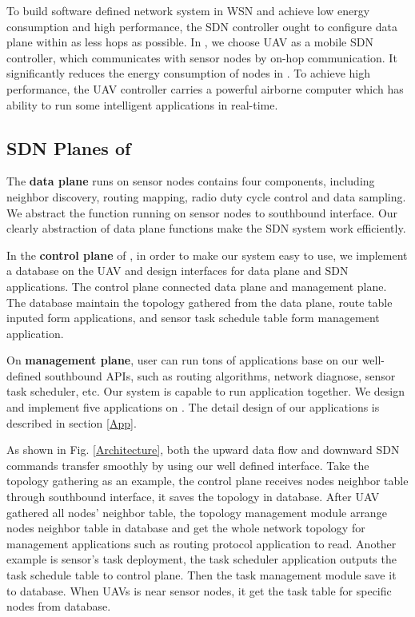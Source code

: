 To build software defined network system in WSN and achieve low 
energy consumption and high performance, the SDN controller ought to  
configure data plane within as less hops as possible.  
In {\sdn}, we choose UAV as a mobile SDN controller,  
which communicates with sensor nodes by on-hop communication.
It significantly reduces the energy consumption of nodes in {\sdn}. 
To achieve high performance, the UAV controller carries
a powerful airborne computer which has ability to run 
some intelligent applications in real-time.

\subsection{SDN Planes of {\sdn}}
The \textbf{data plane} runs on sensor nodes contains four components, including neighbor discovery, routing mapping, radio duty cycle control and data sampling. We abstract the function running on sensor nodes to southbound interface. Our clearly abstraction of data plane functions make the SDN system work efficiently.

In the \textbf{control plane} of {\sdn}, in order to make our system easy to use, we implement a database on the UAV and design interfaces for data plane and SDN applications. The control plane connected data plane and management plane. The database maintain the topology gathered from the data plane, route table inputed form applications, and sensor task schedule table form management application.

On \textbf{management plane}, user can run tons of applications base on our well-defined southbound APIs, such as routing algorithms, network diagnose, sensor task 
scheduler, etc. Our system is capable to run application together. We design and implement five applications on {\sdn}. The detail design of our applications is described in section \ref{App}. 

As shown in Fig. \ref{Architecture}, both the upward data flow and downward SDN commands transfer smoothly by using our well defined interface. Take the topology gathering as an example, the control plane receives nodes neighbor table through southbound interface, it saves the topology in database. After UAV gathered all nodes' neighbor table, the topology management module arrange nodes neighbor table in database and get the whole network topology for management applications such as routing protocol application to read. Another example is sensor's task deployment, the task scheduler application outputs the task schedule table to control plane. Then the task management module save it to database. When UAVs is near sensor nodes, it get the task table for specific nodes from database. 

